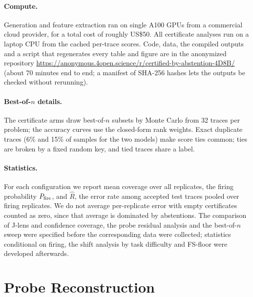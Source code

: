 \paragraph{Compute.} Generation and feature extraction ran on single A100 GPUs from a commercial cloud provider, for a total cost of roughly US\$50. All certificate analyses run on a laptop CPU from the cached per-trace scores. Code, data, the compiled outputs and a script that regenerates every table and figure are in the anonymized repository \url{https://anonymous.4open.science/r/certified-by-abstention-4D8B/} (about 70 minutes end to end; a manifest of SHA-256 hashes lets the outputs be checked without rerunning).

\paragraph{Best-of-$n$ details.} The certificate arms draw best-of-$n$ subsets by Monte Carlo from 32 traces per problem; the accuracy curves use the closed-form rank weights. Exact duplicate traces (6\% and 15\% of samples for the two models) make score ties common; ties are broken by a fixed random key, and tied traces share a label.

\paragraph{Statistics.} For each configuration we report mean coverage over all replicates, the firing probability $P_{\mathrm{fire}}$, and $\hat R$, the error rate among accepted test traces pooled over firing replicates. We do not average per-replicate error with empty certificates counted as zero, since that average is dominated by abstentions. The comparison of J-lens and confidence coverage, the probe residual analysis and the best-of-$n$ sweep were specified before the corresponding data were collected; statistics conditional on firing, the shift analysis by task difficulty and FS-floor were developed afterwards.

\section{Probe Reconstruction}
\label{app:recon}

